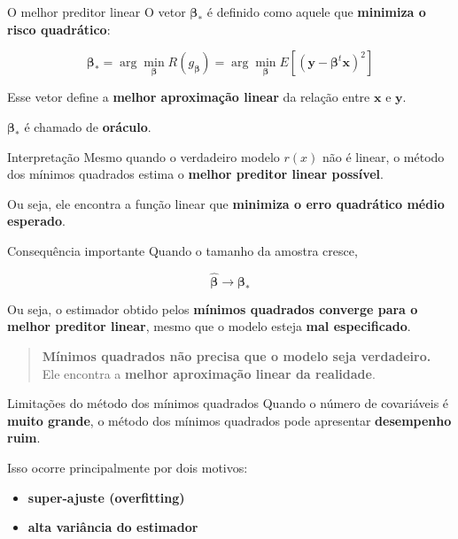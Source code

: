 \documentclass[
  ignorenonframetext,
  aspectratio=169,
]{beamer}
\providecommand{\tightlist}{%
  \setlength{\itemsep}{0pt}\setlength{\parskip}{0pt}}
\begin{document}
\begin{frame}
\begin{block}{O melhor preditor linear}
\label{o-melhor-preditor-linear}
O vetor \(\boldsymbol{\beta}_*\) é definido como aquele que
\textbf{minimiza o risco quadrático}:

\[
\boldsymbol{\beta}_* =
\arg\min_{\boldsymbol{\beta}}
R(g_{\boldsymbol{\beta}})
=
\arg\min_{\boldsymbol{\beta}}
E[(\boldsymbol{y} - \boldsymbol{\beta}^t \mathbf{x})^2]
\]

Esse vetor define a \textbf{melhor aproximação linear} da relação entre
\(\mathbf{x}\) e \(\boldsymbol{y}\).

\(\boldsymbol{\beta}_*\) é chamado de \textbf{oráculo}.
\end{block}
\end{frame}

\begin{frame}
\begin{block}{Interpretação}
\label{interpretauxe7uxe3o-1}
Mesmo quando o verdadeiro modelo \(r(x)\) não é linear, o método dos
mínimos quadrados estima o \textbf{melhor preditor linear possível}.

Ou seja, ele encontra a função linear que \textbf{minimiza o erro
quadrático médio esperado}.
\end{block}
\end{frame}

\begin{frame}
\begin{block}{Consequência importante}
\label{consequuxeancia-importante}
Quando o tamanho da amostra cresce,

\[
\hat{\boldsymbol{\beta}} \rightarrow \boldsymbol{\beta}_* 
\]

Ou seja, o estimador obtido pelos \textbf{mínimos quadrados converge
para o melhor preditor linear}, mesmo que o modelo esteja \textbf{mal
especificado}.

\begin{quote}
\textbf{Mínimos quadrados não precisa que o modelo seja verdadeiro.}\\
Ele encontra a \textbf{melhor aproximação linear da realidade}.
\end{quote}
\end{block}
\end{frame}

\begin{frame}{Limitações do método dos mínimos quadrados}
\label{limitauxe7uxf5es-do-muxe9todo-dos-muxednimos-quadrados}
Quando o número de covariáveis é \textbf{muito grande}, o método dos
mínimos quadrados pode apresentar \textbf{desempenho ruim}.

Isso ocorre principalmente por dois motivos:

\begin{itemize}
\tightlist
\item
  \textbf{super-ajuste (overfitting)}\\
\item
  \textbf{alta variância do estimador}
\end{itemize}
\end{frame}
\end{document}
